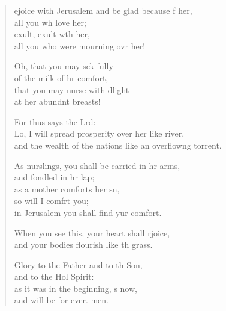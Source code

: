 \settowidth{\versewidth}{and the wealth of the nations like an overflowing torrent.}
\begin{verse}%
  \begin{patverse}
ejoice with Jerusalem and be glad because f her,\Med\\
all you wh love her;\\
exult, exult w\pointup{\i}th her,\Med\\
all you who were mourning ovr her!

Oh, that you may sck fully\Med\\
of the milk of hr comfort,\\
that you may nurse with dlight\Med\\
at her abundnt breasts!

For thus says the Lrd:\Flex\\
Lo, I will spread prosperity over her like  river,\Med\\
and the wealth of the nations like an overflow\pointup{\i}ng torrent.

As nurslings, you shall be carried in hr arms,\Med\\
and fondled in hr lap;\\
as a mother comforts her sn,\Flex\\
so will I comfrt you;\Med\\
in Jerusalem you shall find yur comfort.

When you see this, your heart shall rjoice,\Med\\
and your bodies flourish like th grass.

Glory to the Father and to th Son,\Med\\
and to the Hol Spirit:\\
as it was in the beginning, \pointup{\i}s now,\Med\\
and will be for ever. men.
  \end{patverse}
\end{verse}

